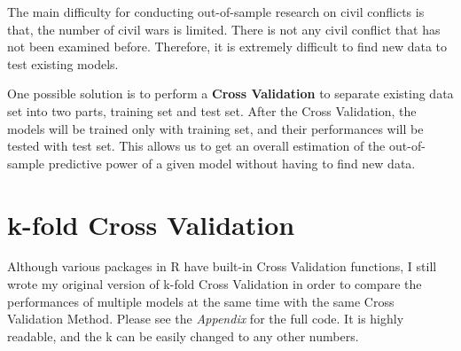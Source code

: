 \documentclass{article}
\begin{document}
The main difficulty for conducting out-of-sample research on civil conflicts is that, the number of civil wars is limited. There is not any civil conflict that has not been examined before. Therefore, it is extremely difficult to find new data to test existing models.

One possible solution is to perform a \textbf{Cross Validation} to separate existing data set into two parts, training set and test set. After the Cross Validation, the models will be trained only with training set, and their performances will be tested with test set. This allows us to get an overall estimation of the out-of-sample predictive power of a given model without having to find new data.

\section{k-fold Cross Validation}

Although various packages in R have built-in Cross Validation functions, I still wrote my original version of k-fold Cross Validation in order to compare the performances of multiple models at the same time with the same Cross Validation Method. Please see the \textit{Appendix} for the full code. It is highly readable, and the k can be easily changed to any other numbers.
\end{document}
